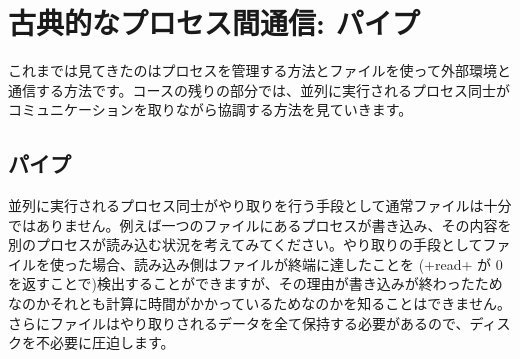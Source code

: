 %
%

\chapter{\label{sec/pipes}古典的なプロセス間通信: パイプ}


これまでは見てきたのはプロセスを管理する方法とファイルを使って外部環境と通信する方法です。コースの残りの部分では、並列に実行されるプロセス同士がコミュニケーションを取りながら協調する方法を見ていきます。

\section{パイプ}

並列に実行されるプロセス同士がやり取りを行う手段として通常ファイルは十分ではありません。例えば一つのファイルにあるプロセスが書き込み、その内容を別のプロセスが読み込む状況を考えてみてください。やり取りの手段としてファイルを使った場合、読み込み側はファイルが終端に達したことを (\ml+read+ が 0 を返すことで)検出することができますが、その理由が書き込みが終わったためなのかそれとも計算に時間がかかっているためなのかを知ることはできません。さらにファイルはやり取りされるデータを全て保持する必要があるので、ディスクを不必要に圧迫します。

